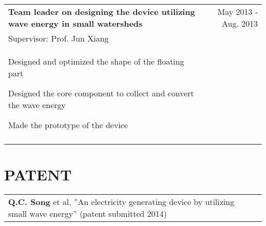 \documentclass[a4paper,10pt]{article}
\begin{document}
\begin{tabular}{p{14cm}r}
 \textbf{Team leader on designing the device utilizing wave energy in small watersheds}  &May 2013 - Aug. 2013 \\
\hspace{1em}  Supervisor: Prof. Jun Xiang  & \vspace{-0.5em}\\
\begin{compactitem}
       \item Designed and optimized the shape of the floating part\vspace{0.2em}
       \item Designed the core component to collect and convert the wave energy\vspace{0.2em}
       \item Made the prototype of the device
     \end{compactitem}&\vspace{-1em} \\
\multicolumn{2}{c}{} \vspace{-1.5em} \\


\end{tabular}

\section{PATENT}
\begin{tabular}{p{16cm}l}
\textbf{Q.C. Song} et al, ”An electricity generating device by utilizing small wave energy” (patent submitted 2014) &\\
\end{tabular}
\end{document}
